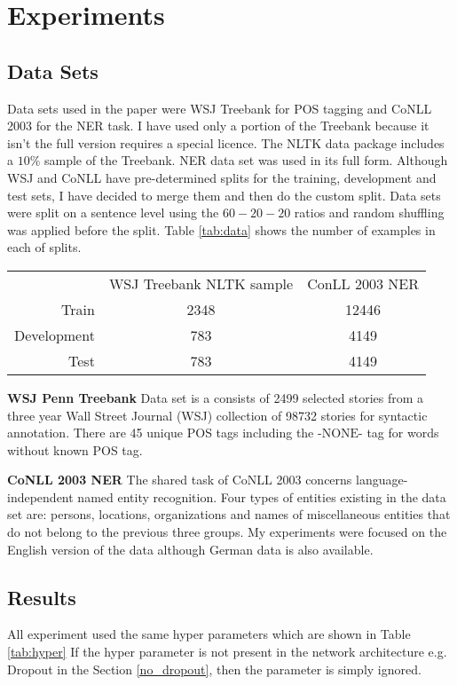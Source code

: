 \section{Experiments}

\subsection{Data Sets}
Data sets used in the paper were WSJ Treebank for POS tagging and CoNLL 2003
for the NER task. I have used only a portion of the Treebank because it isn't
the full version requires a special licence. The NLTK data package includes a
$10\%$ sample of the Treebank. NER data set was used in its full form.
Although WSJ and CoNLL have  pre-determined splits for the training,
development and test sets, I have decided to merge them and then do the custom
split. Data sets were split on a sentence level using the $60 - 20 - 20$ ratios
and random shuffling was applied before the split. Table \ref{tab:data} shows
the number of examples in each of splits.

\begin{tabular}{ r|c|c| }
\multicolumn{1}{r}{}
 &  \multicolumn{1}{c}{WSJ Treebank NLTK sample}
 & \multicolumn{1}{c}{ConLL 2003 NER} \\
\cline{2-3}
Train & 2348 & 12446 \\
\cline{2-3}
Development & 783 & 4149 \\
\cline{2-3}
Test & 783 & 4149 \\
\cline{2-3}
\end{tabular}
\label{tab:data}


\textbf{WSJ Penn Treebank}
Data set is a consists of 2499 selected stories from a three year Wall Street
Journal (WSJ) collection of 98732 stories for syntactic annotation. There are
45 unique POS tags including the $\text{-NONE-}$ tag for words without known POS tag. 

\textbf{CoNLL 2003 NER}
The shared task of CoNLL 2003 concerns language-independent named entity
recognition. Four types of entities existing in the data set are: persons,
locations, organizations and names of miscellaneous entities that do not belong
to the previous three groups. My experiments were focused on the English
version of the data although German data is also available.

\subsection{Results}
All experiment used the same hyper parameters which are shown in Table
\ref{tab:hyper} If the hyper parameter is not present in the network
architecture e.g. Dropout in the Section \ref{no_dropout}, then the parameter
is simply ignored.

